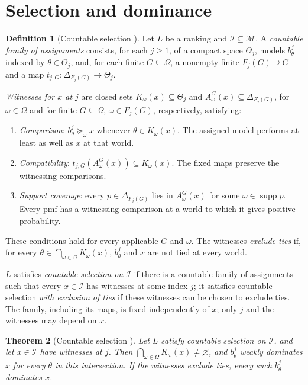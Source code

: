 \documentclass[11pt]{article}
\newtheorem{theorem}{Theorem}[section]
\theoremstyle{definition}
\newtheorem{definition}[theorem]{Definition}
\newcommand{\M}{\mathcal M}
\newcommand{\I}{\mathcal I}
\DeclareMathOperator{\supp}{supp}
\begin{document}
\section{Selection and dominance}\label{sec:selection}

\begin{definition}[Countable selection {\cite{LDG}}]\label{def:selection}
Let $L$ be a ranking and $\I\subseteq\M$. A \emph{countable family of assignments} consists, for each $j\ge1$, of a compact space $\Theta_j$, models $b^j_\theta$ indexed by $\theta\in\Theta_j$, and, for each finite $G\subseteq\Omega$, a nonempty finite $F_j(G)\supseteq G$ and a map $t_{j,G}:\Delta_{F_j(G)}\to\Theta_j$.

\emph{Witnesses for $x$ at $j$} are closed sets $K_\omega(x)\subseteq\Theta_j$ and $A^G_\omega(x)\subseteq\Delta_{F_j(G)}$, for $\omega\in\Omega$ and for finite $G\subseteq\Omega$, $\omega\in F_j(G)$, respectively, satisfying:
\begin{enumerate}[label=\textbf{(W\arabic*)},leftmargin=3.2em]
\item \emph{Comparison}: $b^j_\theta\succeq_\omega x$ whenever $\theta\in K_\omega(x)$. The assigned model performs at least as well as $x$ at that world.
\item \emph{Compatibility}: $t_{j,G}(A^G_\omega(x))\subseteq K_\omega(x)$. The fixed maps preserve the witnessing comparisons.
\item \emph{Support coverage}: every $p\in\Delta_{F_j(G)}$ lies in $A^G_\omega(x)$ for some $\omega\in\supp p$. Every pmf has a witnessing comparison at a world to which it gives positive probability.
\end{enumerate}
These conditions hold for every applicable $G$ and $\omega$. The witnesses \emph{exclude ties} if, for every $\theta\in\bigcap_{\omega\in\Omega}K_\omega(x)$, $b^j_\theta$ and $x$ are not tied at every world.

$L$ satisfies \emph{countable selection on $\I$} if there is a countable family of assignments such that every $x\in\I$ has witnesses at some index $j$; it satisfies countable selection \emph{with exclusion of ties} if these witnesses can be chosen to exclude ties. The family, including its maps, is fixed independently of $x$; only $j$ and the witnesses may depend on $x$.
\end{definition}

\begin{theorem}[Countable selection {\cite{LDG}}]\label{thm:LDGgeneral} Let $L$ satisfy countable selection on $\I$, and let $x\in\I$ have witnesses at $j$. Then $\bigcap_{\omega\in\Omega}K_\omega(x)\ne\varnothing$, and $b^j_\theta$ weakly dominates $x$ for every $\theta$ in this intersection. If the witnesses exclude ties, every such $b^j_\theta$ dominates $x$.
\end{theorem}
\end{document}
